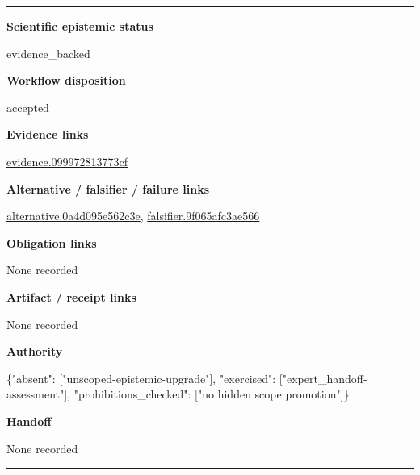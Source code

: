 \documentclass[10pt,a4paper]{article}
\newcommand{\TraceField}[2]{\par\noindent\textbf{#1}\par\noindent #2\par\smallskip}
\newenvironment{TraceDossier}{\par\medskip\noindent\hrule\medskip}{\medskip\hrule\par\medskip}
\begin{document}
\begin{TraceDossier}
\TraceField{Scientific epistemic status}{evidence\_\allowbreak{}backed}

\TraceField{Workflow disposition}{accepted}

\TraceField{Evidence links}{\hyperlink{trace-evidence-51865e77c11f35c739}{evidence.\allowbreak{}0999728137\allowbreak{}73cf}}

\TraceField{Alternative / falsifier / failure links}{\hyperlink{trace-alternative-896b926df8b1a9deb7}{alternativ\allowbreak{}e.\allowbreak{}0a4d095e56\allowbreak{}2c3e}, \hyperlink{trace-alternative-31ce2e5687e0b6784b}{falsifier.\allowbreak{}9f065afc3a\allowbreak{}e566}}

\TraceField{Obligation links}{None recorded}

\TraceField{Artifact / receipt links}{None recorded}

\TraceField{Authority}{\{"absent":\allowbreak{} ["unscoped\allowbreak{}-\allowbreak{}epistemic-\allowbreak{}upgrade"],\allowbreak{} "exercised\allowbreak{}":\allowbreak{} ["expert\_\allowbreak{}handoff-\allowbreak{}assessment\allowbreak{}"], "prohibiti\allowbreak{}ons\_\allowbreak{}checked":\allowbreak{} ["no hidden scope promotion"\allowbreak{}]\}}

\TraceField{Handoff}{None recorded}

\end{TraceDossier}
\end{document}

